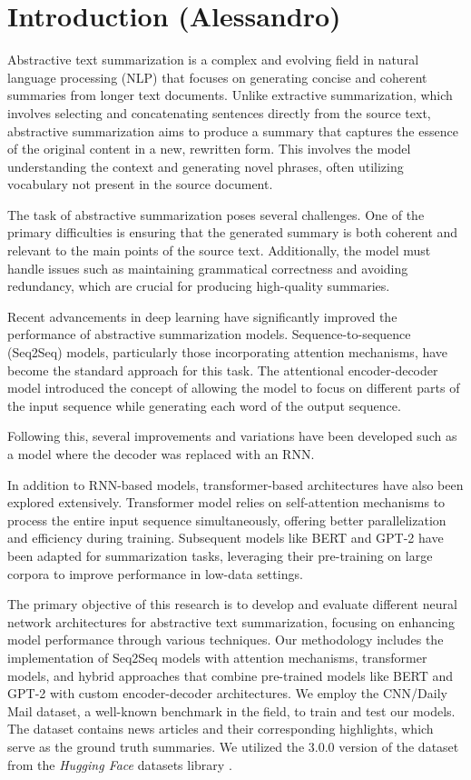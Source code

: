 \section{Introduction (Alessandro)}
Abstractive text summarization is a complex and evolving field in natural language processing (NLP) that focuses on generating concise and coherent summaries from longer text documents. Unlike extractive summarization, which involves selecting and concatenating sentences directly from the source text, abstractive summarization aims to produce a summary that captures the essence of the original content in a new, rewritten form. This involves the model understanding the context and generating novel phrases, often utilizing vocabulary not present in the source document.

The task of abstractive summarization poses several challenges. One of the primary difficulties is ensuring that the generated summary is both coherent and relevant to the main points of the source text. Additionally, the model must handle issues such as maintaining grammatical correctness and avoiding redundancy, which are crucial for producing high-quality summaries.

Recent advancements in deep learning have significantly improved the performance of abstractive summarization models. Sequence-to-sequence (Seq2Seq) models, particularly those incorporating attention mechanisms, have become the standard approach for this task. The attentional encoder-decoder model \cite{bahdanau2014neural} introduced the concept of allowing the model to focus on different parts of the input sequence while generating each word of the output sequence.

Following this, several improvements and variations have been developed such as a model where the decoder was replaced with an RNN\cite{nallapati2016abstractive}. 

In addition to RNN-based models, transformer-based architectures have also been explored extensively. Transformer model \cite{transformer} relies on self-attention mechanisms to process the entire input sequence simultaneously, offering better parallelization and efficiency during training. Subsequent models like BERT \cite{devlin2018bert} and GPT-2 \cite{radford2019language} have been adapted for summarization tasks, leveraging their pre-training on large corpora to improve performance in low-data settings.

The primary objective of this research is to develop and evaluate different neural network architectures for abstractive text summarization, focusing on enhancing model performance through various techniques. Our methodology includes the implementation of Seq2Seq models with attention mechanisms, transformer models, and hybrid approaches that combine pre-trained models like BERT and GPT-2 with custom encoder-decoder architectures. We employ the CNN/Daily Mail dataset, a well-known benchmark in the field, to train and test our models. The dataset contains news articles and their corresponding highlights, which serve as the ground truth summaries. We utilized the 3.0.0 version of the dataset from the \textit{Hugging Face} datasets library \cite{huggingface_cnn_dailymail}.

